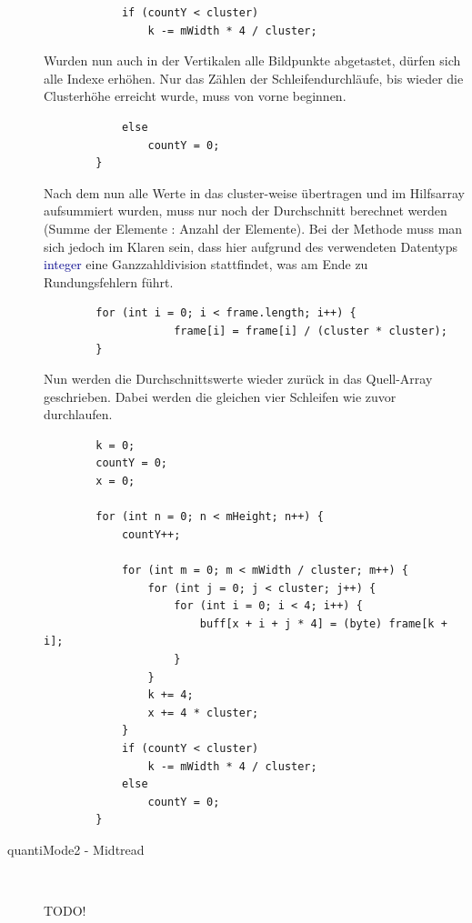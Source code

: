 \begin{description}
\begin{lstlisting}            
            if (countY < cluster)                                                                   
                k -= mWidth * 4 / cluster;                                                          
\end{lstlisting}
Wurden nun auch in der Vertikalen alle Bildpunkte abgetastet, dürfen sich alle Indexe erhöhen. Nur das Zählen der Schleifendurchläufe, bis wieder die Clusterhöhe erreicht wurde, muss von vorne beginnen.
\begin{lstlisting}
            else
                countY = 0;                                                                         
        }
\end{lstlisting}
Nach dem nun alle Werte in das cluster-weise übertragen und im Hilfsarray aufsummiert wurden, muss nur noch der Durchschnitt berechnet werden (Summe der Elemente : Anzahl der Elemente). Bei der Methode muss man sich jedoch im Klaren sein, dass hier aufgrund des verwendeten Datentyps \textcolor{darkblue}{integer} eine Ganzzahldivision stattfindet, was am Ende zu Rundungsfehlern führt.
\begin{lstlisting}
        for (int i = 0; i < frame.length; i++) {
                    frame[i] = frame[i] / (cluster * cluster);
        }
\end{lstlisting}
Nun werden die Durchschnittswerte wieder zurück in das Quell-Array geschrieben. Dabei werden die gleichen vier Schleifen wie zuvor durchlaufen. 
\begin{lstlisting}
        k = 0;
        countY = 0;
        x = 0;

        for (int n = 0; n < mHeight; n++) {
            countY++;

            for (int m = 0; m < mWidth / cluster; m++) {
                for (int j = 0; j < cluster; j++) {
                    for (int i = 0; i < 4; i++) {
                        buff[x + i + j * 4] = (byte) frame[k + i];
                    }
                }
                k += 4;
                x += 4 * cluster;
            }
            if (countY < cluster)
                k -= mWidth * 4 / cluster;
            else
                countY = 0;
        }
\end{lstlisting}


\item[quantiMode2 - Midtread]~\par
\label{quantimode2}

TODO!



\end{description}

